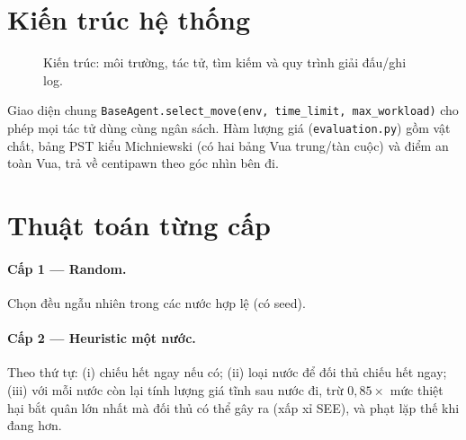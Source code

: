 \documentclass[13pt,a4paper]{extreport}
\newcommand{\code}[1]{\texttt{#1}}
\begin{document}
\section{Kiến trúc hệ thống}
\begin{figure}[H]\centering
{}
\caption{Kiến trúc: môi trường, tác tử, tìm kiếm và quy trình giải đấu/ghi log.}\end{figure}
Giao diện chung \code{BaseAgent.select\_move(env, time\_limit, max\_workload)} cho phép mọi tác tử dùng cùng ngân sách. Hàm lượng giá (\code{evaluation.py}) gồm vật chất, bảng PST kiểu Michniewski (có hai bảng Vua trung/tàn cuộc) và điểm an toàn Vua, trả về centipawn theo góc nhìn bên đi.

\section{Thuật toán từng cấp}
\paragraph{Cấp 1 --- Random.} Chọn đều ngẫu nhiên trong các nước hợp lệ (có seed).
\paragraph{Cấp 2 --- Heuristic một nước.} Theo thứ tự: (i) chiếu hết ngay nếu có; (ii) loại nước để đối thủ chiếu hết ngay; (iii) với mỗi nước còn lại tính lượng giá tĩnh sau nước đi, trừ $0{,}85\times$ mức thiệt hại bắt quân lớn nhất mà đối thủ có thể gây ra (xấp xỉ SEE), và phạt lặp thế khi đang hơn.
\end{document}
